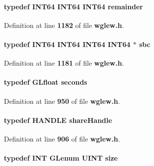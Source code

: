 \paragraph[{remainder}]{\setlength{\rightskip}{0pt plus 5cm}typedef {\bf I\+N\+T64} {\bf I\+N\+T64} {\bf I\+N\+T64} {\bf remainder}}\label{wglew_8h_a226a3effbf4b18fa52a40406d23ab396}


Definition at line {\bf 1182} of file {\bf wglew.\+h}.

\paragraph[{sbc}]{\setlength{\rightskip}{0pt plus 5cm}typedef {\bf I\+N\+T64} {\bf I\+N\+T64} {\bf I\+N\+T64} {\bf I\+N\+T64} $\ast$ {\bf sbc}}\label{wglew_8h_a736174037e55824c2eb6f4cf40ff5965}


Definition at line {\bf 1181} of file {\bf wglew.\+h}.

\paragraph[{seconds}]{\setlength{\rightskip}{0pt plus 5cm}typedef {\bf G\+Lfloat} {\bf seconds}}\label{wglew_8h_a0b0bf11730a56d9138d77ed713db634e}


Definition at line {\bf 950} of file {\bf wglew.\+h}.

\paragraph[{share\+Handle}]{\setlength{\rightskip}{0pt plus 5cm}typedef {\bf H\+A\+N\+D\+LE} {\bf share\+Handle}}\label{wglew_8h_a17b3a73ead77f2d296edbe77ec48cc61}


Definition at line {\bf 906} of file {\bf wglew.\+h}.

\paragraph[{size}]{\setlength{\rightskip}{0pt plus 5cm}typedef {\bf I\+NT} {\bf G\+Lenum} {\bf U\+I\+NT} {\bf size}}\label{wglew_8h_ad2b499a6f510792ae5b522526738a607}


